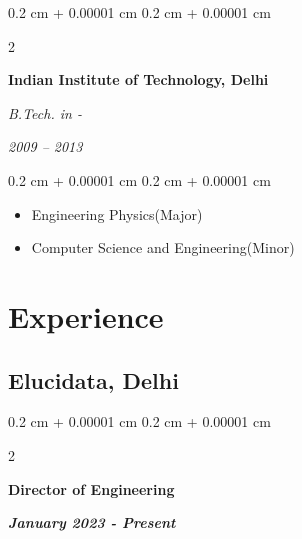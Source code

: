 \documentclass[10pt, letterpaper]{article}
\newenvironment{highlights}{
    \begin{itemize}[
        topsep=0.10 cm,
        parsep=0.10 cm,
        partopsep=0pt,
        itemsep=0pt,
        leftmargin=0.4 cm + 10pt
    ]
}{
    \end{itemize}
} %
\newenvironment{onecolentry}{
    \begin{adjustwidth}{
        0.2 cm + 0.00001 cm
    }{
        0.2 cm + 0.00001 cm
    }
}{
    \end{adjustwidth}
} %
\newenvironment{twocolentry}[2][]{
    \onecolentry
    \def\secondColumn{#2}
    \setcolumnwidth{\fill, 6.0 cm}
    \begin{paracol}{2}
}{
    \switchcolumn \raggedleft \secondColumn
    \end{paracol}
    \endonecolentry
} %
\begin{document}
        
        \begin{twocolentry}{
            
            
        \textit{2009 – 2013}}
            \textbf{Indian Institute of Technology, Delhi}

            \vspace{0.10 cm}

            \textit{B.Tech. in -}
        \end{twocolentry}

        \vspace{0.10 cm}
        \begin{onecolentry}
            \begin{highlights}
                \item Engineering Physics(Major)
                \item Computer Science and Engineering(Minor)
            \end{highlights}
        \end{onecolentry}



    
    \section{Experience}
        \subsection{Elucidata, Delhi}
            \begin{twocolentry}{  
                \textit{\textbf{January 2023 - Present}}}
                \textbf{Director of Engineering}
            \end{twocolentry}

            \vspace{0.10 cm}
            
\end{document}
